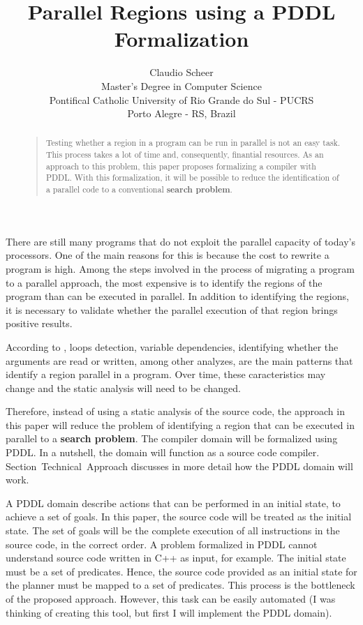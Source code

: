 \documentclass[letterpaper]{article}
\begin{document}
\title{Parallel Regions using a PDDL Formalization}
\author{Claudio Scheer\\
  Master's Degree in Computer Science\\
  Pontifical Catholic University of Rio Grande do Sul - PUCRS\\
  Porto Alegre - RS, Brazil\\
}
\maketitle

\begin{abstract}
  \begin{quote}
    Testing whether a region in a program can be run in parallel is not an easy task. This process takes a lot of time and, consequently, finantial resources. As an approach to this problem, this paper proposes formalizing a compiler with PDDL. With this formalization, it will be possible to reduce the identification of a parallel code to a conventional \textbf{search problem}.
  \end{quote}
\end{abstract}

\noindent There are still many programs that do not exploit the parallel capacity of today's processors. One of the main reasons for this is because the cost to rewrite a program is high. Among the steps involved in the process of migrating a program to a parallel approach, the most expensive is to identify the regions of the program than can be executed in parallel. In addition to identifying the regions, it is necessary to validate whether the parallel execution of that region brings positive results.

According to \cite{doi:10.1177/1094342017695639}, loops detection, variable dependencies, identifying whether the arguments are read or written, among other analyzes, are the main patterns that identify a region parallel in a program. Over time, these caracteristics may change and the static analysis will need to be changed.

Therefore, instead of using a static analysis of the source code, the approach in this paper will reduce the problem of identifying a region that can be executed in parallel to a \textbf{search problem}. The compiler domain will be formalized using PDDL. In a nutshell, the domain will function as a source code compiler. Section~Technical~Approach discusses in more detail how the PDDL domain will work.

A PDDL domain describe actions that can be performed in an initial state, to achieve a set of goals. In this paper, the source code will be treated as the initial state. The set of goals will be the complete execution of all instructions in the source code, in the correct order. A problem formalized in PDDL cannot understand source code written in C++ as input, for example. The initial state must be a set of predicates. Hence, the source code provided as an initial state for the planner must be mapped to a set of predicates. This process is the bottleneck of the proposed approach. However, this task can be easily automated (I was thinking of creating this tool, but first I will implement the PDDL domain).
\end{document}
